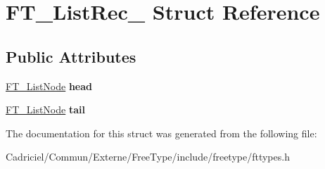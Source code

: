 \hypertarget{struct_f_t___list_rec__}{\section{F\-T\-\_\-\-List\-Rec\-\_\- Struct Reference}
\label{struct_f_t___list_rec__}
}
\subsection*{Public Attributes}
\begin{DoxyCompactItemize}
\item 
\hypertarget{struct_f_t___list_rec___a09ed35c2bcdc1c3acd12ff4650dfdeb9}{\hyperlink{struct_f_t___list_node_rec__}{F\-T\-\_\-\-List\-Node} {\bfseries head}}\label{struct_f_t___list_rec___a09ed35c2bcdc1c3acd12ff4650dfdeb9}

\item 
\hypertarget{struct_f_t___list_rec___a4664761f0ab2af3d48231b00cd978b23}{\hyperlink{struct_f_t___list_node_rec__}{F\-T\-\_\-\-List\-Node} {\bfseries tail}}\label{struct_f_t___list_rec___a4664761f0ab2af3d48231b00cd978b23}

\end{DoxyCompactItemize}


The documentation for this struct was generated from the following file\-:\begin{DoxyCompactItemize}
\item 
Cadriciel/\-Commun/\-Externe/\-Free\-Type/include/freetype/fttypes.\-h\end{DoxyCompactItemize}

